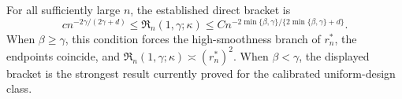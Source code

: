 For all sufficiently large \(n\), the established direct bracket is
\[
c n^{-2\gamma/(2\gamma+d)}
\le \mathfrak R_n(1,\gamma;\kappa)
\le C n^{-2\min\{\beta,\gamma\}/\{2\min\{\beta,\gamma\}+d\}}.
\]
When \(\beta\ge\gamma\), this condition forces the high-smoothness branch of \(r_n^*\), the endpoints coincide, and \(\mathfrak R_n(1,\gamma;\kappa)\asymp(r_n^*)^2\). When \(\beta<\gamma\), the displayed bracket is the strongest result currently proved for the calibrated uniform-design class.